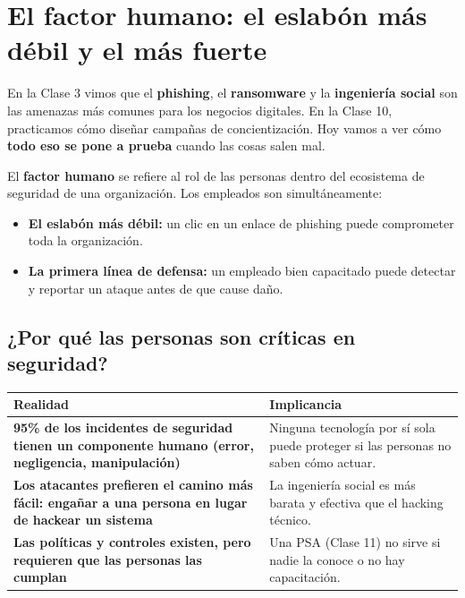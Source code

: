 \documentclass[12pt,a4paper]{article}
\renewcommand{\arraystretch}{1.25}
\begin{document}
\tableofcontents
\newpage

\section{El factor humano: el eslab\'on m\'as d\'ebil y el m\'as fuerte}

En la Clase 3 vimos que el \textbf{phishing}, el \textbf{ransomware} y la \textbf{ingenier\'ia social} son las amenazas m\'as comunes para los negocios digitales. En la Clase 10, practicamos c\'omo dise\~nar campa\~nas de concientizaci\'on. Hoy vamos a ver c\'omo \textbf{todo eso se pone a prueba} cuando las cosas salen mal.

\begin{cajaDefinicion}
El \textbf{factor humano} se refiere al rol de las personas dentro del ecosistema de seguridad de una organizaci\'on. Los empleados son simult\'aneamente:
\begin{itemize}[leftmargin=2em]
    \item \textbf{El eslab\'on m\'as d\'ebil:} un clic en un enlace de phishing puede comprometer toda la organizaci\'on.
    \item \textbf{La primera l\'inea de defensa:} un empleado bien capacitado puede detectar y reportar un ataque antes de que cause da\~no.
\end{itemize}
\end{cajaDefinicion}

\subsection{¿Por qu\'e las personas son cr\'iticas en seguridad?}

\renewcommand{\arraystretch}{1.5}
\begin{tabularx}{\textwidth}{|>{\bfseries\color{azulUCA}}p{3.5cm}|X|}
\hline
\rowcolor{grisClaro}
\textbf{Realidad} & \textbf{Implicancia} \\
\hline
95\% de los incidentes de seguridad tienen un componente humano (error, negligencia, manipulación) & Ninguna tecnología por sí sola puede proteger si las personas no saben cómo actuar. \\
\hline
Los atacantes prefieren el camino más fácil: engañar a una persona en lugar de hackear un sistema & La ingeniería social es más barata y efectiva que el hacking técnico. \\
\hline
Las políticas y controles existen, pero requieren que las personas las cumplan & Una PSA (Clase 11) no sirve si nadie la conoce o no hay capacitación. \\
\hline
\end{tabularx}
\end{document}
